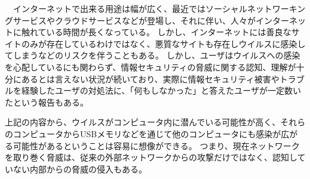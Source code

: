 \begin{comment}
一般に，商用／フリーを問わず現存する多くの汎用ネットワークシミュレータに関して，それぞれが実装している種々のプロトコルモデルについてそのモデル化や実装詳細，基本特性といった項目が明らかにされているものは少ない．そのため，汎用の評価ツールを使用して新たにネットワークを評価する際，モデル化方法や実装内容が明らかになっていることが重要だと言える\cite{joron6}．
本研究に示される方法により，ns-3上で端末やL2スイッチ，L3スイッチの汎用的なモデル化を行い，それを用いて意図した様々なネットワークを構築し，性能評価を行うことができるようになる．
これにより，ns-3上で構築したネットワークの挙動確認や性能評価による改善点の発見を行えるだけでなく，本研究で使用した汎用的なモデルを利用し，新たなネットワークの性能評価を行う際のモデル化や，実装方法の指標とすることができる．
加えて，来年度以降は実際に構築されたEUNETの動作を検証する事でシミュレーションでの計測と実機実験としての計測を行うことができ，シミュレーションを行う際，どのようにEUNETをモデル化する事で，そのモデルが妥当性を持つかを検証する事も可能になると予想される．

本論文では，2章に各シミュレータの比較，シミュレーションを行う上で必要となるネットワーク技術，性能評価量を紹介する．3章にns-3上での大規模ネットワーク構築法と有線ネットワークを構築するために作成したモジュール，4章に作成したモジュールの動作検証について述べ，最後に5章でまとめと今後の課題を述べる．
\end{comment}

　インターネットで出来る用途は幅が広く、最近ではソーシャルネットワーキングサービスやクラウドサービスなどが登場し、それに伴い、人々がインターネットに触れている時間が長くなっている。
しかし、インターネットには善良なサイトのみが存在しているわけではなく、悪質なサイトも存在しウイルスに感染してしまうなどのリスクを伴うこともある。
しかし、ユーザはウイルスへの感染を心配しているにも関わらず、情報セキュリティの脅威に関する認知、理解が十分にあるとは言えない状況が続いており、実際に情報セキュリティ被害やトラブルを経験したユーザの対処法に、「何もしなかった」と答えたユーザが一定数いたという報告もある\cite{joron1}。

上記の内容から、ウイルスがコンピュータ内に潜んでいる可能性が高く、それらのコンピュータからUSBメモリなどを通じて他のコンピュータにも感染が広がる可能性があるということは容易に想像ができる。
つまり、現在ネットワークを取り巻く脅威は、従来の外部ネットワークからの攻撃だけではなく、認知していない内部からの脅威の侵入もある。